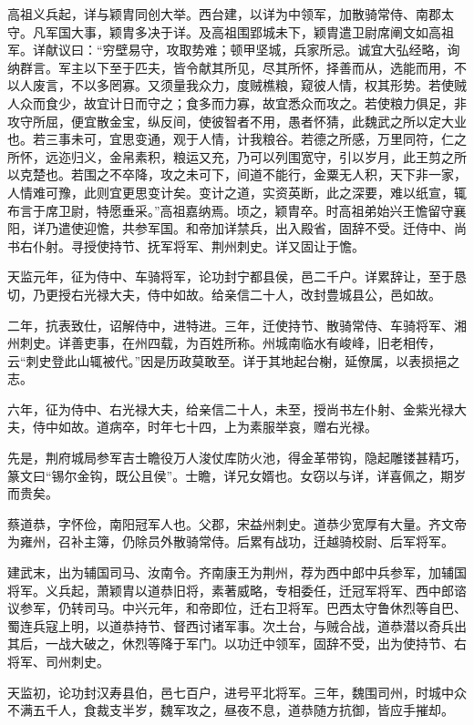 \documentclass[12pt,UTF8]{ctexbook}
\begin{document}
高祖义兵起，详与颖胄同创大举。西台建，以详为中领军，加散骑常侍、南郡太守。凡军国大事，颖胄多决于详。及高祖围郢城未下，颖胄遣卫尉席阐文如高祖军。详献议曰：“穷壁易守，攻取势难；顿甲坚城，兵家所忌。诚宜大弘经略，询纳群言。军主以下至于匹夫，皆令献其所见，尽其所怀，择善而从，选能而用，不以人废言，不以多罔寡。又须量我众力，度贼樵粮，窥彼人情，权其形势。若使贼人众而食少，故宜计日而守之；食多而力寡，故宜悉众而攻之。若使粮力俱足，非攻守所屈，便宜散金宝，纵反间，使彼智者不用，愚者怀猜，此魏武之所以定大业也。若三事未可，宜思变通，观于人情，计我粮谷。若德之所感，万里同符，仁之所怀，远迩归义，金帛素积，粮运又充，乃可以列围宽守，引以岁月，此王剪之所以克楚也。若围之不卒降，攻之未可下，间道不能行，金粟无人积，天下非一家，人情难可豫，此则宜更思变计矣。变计之道，实资英断，此之深要，难以纸宣，辄布言于席卫尉，特愿垂采。”高祖嘉纳焉。顷之，颖胄卒。时高祖弟始兴王憺留守襄阳，详乃遣使迎憺，共参军国。和帝加详禁兵，出入殿省，固辞不受。迁侍中、尚书右仆射。寻授使持节、抚军将军、荆州刺史。详又固让于憺。

天监元年，征为侍中、车骑将军，论功封宁都县侯，邑二千户。详累辞让，至于恳切，乃更授右光禄大夫，侍中如故。给亲信二十人，改封豊城县公，邑如故。

二年，抗表致仕，诏解侍中，进特进。三年，迁使持节、散骑常侍、车骑将军、湘州刺史。详善吏事，在州四载，为百姓所称。州城南临水有峻峰，旧老相传，云“刺史登此山辄被代。”因是历政莫敢至。详于其地起台榭，延僚属，以表损挹之志。

六年，征为侍中、右光禄大夫，给亲信二十人，未至，授尚书左仆射、金紫光禄大夫，侍中如故。道病卒，时年七十四，上为素服举哀，赠右光禄。

先是，荆府城局参军吉士瞻役万人浚仗库防火池，得金革带钩，隐起雕镂甚精巧，篆文曰“锡尔金钩，既公且侯”。士瞻，详兄女婿也。女窃以与详，详喜佩之，期岁而贵矣。

蔡道恭，字怀俭，南阳冠军人也。父郡，宋益州刺史。道恭少宽厚有大量。齐文帝为雍州，召补主簿，仍除员外散骑常侍。后累有战功，迁越骑校尉、后军将军。

建武末，出为辅国司马、汝南令。齐南康王为荆州，荐为西中郎中兵参军，加辅国将军。义兵起，萧颖胄以道恭旧将，素著威略，专相委任，迁冠军将军、西中郎谘议参军，仍转司马。中兴元年，和帝即位，迁右卫将军。巴西太守鲁休烈等自巴、蜀连兵寇上明，以道恭持节、督西讨诸军事。次土台，与贼合战，道恭潜以奇兵出其后，一战大破之，休烈等降于军门。以功迁中领军，固辞不受，出为使持节、右将军、司州刺史。

天监初，论功封汉寿县伯，邑七百户，进号平北将军。三年，魏围司州，时城中众不满五千人，食裁支半岁，魏军攻之，昼夜不息，道恭随方抗御，皆应手摧却。
\end{document}
